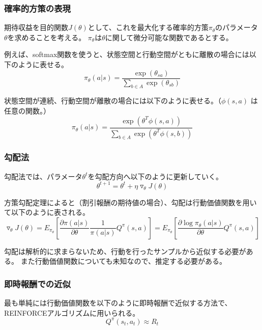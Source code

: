 \documentclass[]{jarticle}
\begin{document}
\subsubsection*{確率的方策の表現}
期待収益を目的関数$J(\theta)$として、これを最大化する確率的方策$\pi_{\theta}$のパラメータ$\theta$を求めることを考える。
$\pi_{\theta}$は$\theta$に関して微分可能な関数であるとする。

例えば、softmax関数を使うと、状態空間と行動空間がともに離散の場合には以下のように表せる。
\begin{equation*}
\pi_\theta(a|s) = \dfrac{\exp(\theta_{sa})}{\sum_{b \in A} \exp(\theta_{sb})}
\end{equation*}

状態空間が連続、行動空間が離散の場合には以下のように表せる。（$\phi(s,a)$ は任意の関数。）
\begin{equation*}
\pi_\theta(a|s) = \dfrac{\exp(\theta^T \phi(s,a))}{\sum_{b \in A} \exp(\theta^T \phi(s,b))}\end{equation*}

\subsubsection*{勾配法}
勾配法では、パラメータ$\theta^t$を勾配方向へ以下のように更新していく。
\begin{equation*}
\theta^{t+1} = \theta^t + \eta \triangledown_\theta J(\theta)
\end{equation*}

方策勾配定理によると（割引報酬の期待値の場合）、勾配は行動価値関数を用いて以下のように表される。
\begin{equation*}
\triangledown_\theta J(\theta) = 
E_{\pi_{\theta}} [\dfrac{\partial \pi(a|s)}{\partial \theta}  \dfrac{1}{\pi(a|s)} Q^{\pi}(s,a)] 
= E_{\pi_{\theta}} [\dfrac{\partial \log \pi_\theta(a|s)}{\partial \theta} Q^{\pi}(s,a)]
\end{equation*}

勾配は解析的に求まらないため、行動を行ったサンプルから近似する必要がある。
また行動価値関数についても未知なので、推定する必要がある。

\subsubsection*{即時報酬での近似}
最も単純には行動価値関数を以下のように即時報酬で近似する方法で、REINFORCEアルゴリズムに用いられる。
\begin{equation*}
Q^\pi(s_t, a_t) \approx R_t
\end{equation*}
\end{document}
